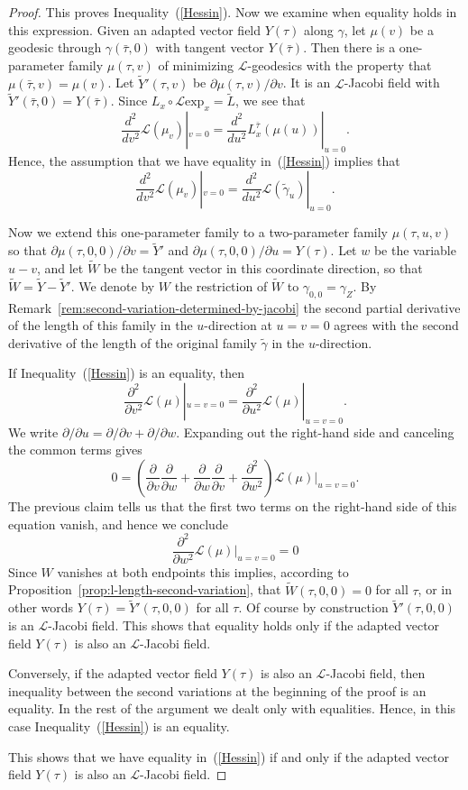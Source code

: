 \begin{proof}
This proves Inequality~(\ref{Hessin}). Now we examine when equality
holds in this expression. Given an adapted vector field $Y(\tau)$
along $\gamma$, let $\mu(v)$ be a geodesic through
$\gamma(\bar\tau,0)$ with tangent vector $Y(\bar\tau)$. Then there
is a one-parameter family $\mu(\tau,v)$ of minimizing ${\mathcal
L}$-geodesics with the property that $\mu(\bar\tau,v)=\mu(v)$. Let
$\widetilde Y'(\tau,v)$ be $\partial\mu(\tau,v)/\partial v$. It is
an ${\mathcal L}$-Jacobi field with $\widetilde
Y'(\bar\tau,0)=Y(\bar\tau)$. Since $L_x\circ {\mathcal L}\mathrm{exp}_x=\widetilde L$, we see that
$$\frac{d^2}{d v^2}{\mathcal
L}(\mu_v)|_{v=0}=\frac{d^2}{du^2}L^{\bar \tau}_x(\mu(u))|_{u=0}.$$
Hence, the assumption that we have equality in~(\ref{Hessin})
implies that
$$\frac{d^2}{d v^2}{\mathcal
L}(\mu_v)|_{v=0}=\frac{d^2}{d u^2}{\mathcal L}(\tilde\gamma_u)|_{u=0}.$$

 Now we extend this
one-parameter family to a two-parameter family $\mu(\tau,u,v)$ so
that $\partial\mu(\tau,0,0)/\partial v=\widetilde Y'$ and
$\partial\mu(\tau,0,0)/\partial u=Y(\tau)$. Let $w$ be the variable
$u-v$, and let $\widetilde W$ be the tangent vector in this
coordinate direction, so that $\widetilde W=\widetilde Y-\widetilde
Y'$. We denote by $W$ the restriction of $\widetilde W$ to
$\gamma_{0,0}=\gamma_Z$. By Remark~\ref{rem:second-variation-determined-by-jacobi} the second
partial derivative of the length of this family in the $u$-direction
at $u=v=0$ agrees with the second derivative of the length of the
original family $\widetilde \gamma$ in the $u$-direction.


If Inequality~(\ref{Hessin}) is an equality, then
$$\frac{\partial^2}{\partial v^2}{\mathcal L}(\mu)|_{u=v=0}=\frac{\partial^2}{\partial u^2}{\mathcal
L}(\mu)|_{u=v=0}.$$ We write $\partial/\partial u=\partial/\partial
v+\partial/\partial w$. Expanding out the right-hand side and
canceling the common terms gives
$$0=\left(\frac{\partial}{\partial v}\frac{\partial}{\partial w}+
\frac{\partial}{\partial w}\frac{\partial}{\partial
v}+\frac{\partial^2}{\partial w^2}\right){\mathcal
L}(\mu)|_{u=v=0}.$$ The previous claim tells us that the first two
terms on the right-hand side of this equation vanish, and hence we
conclude
$$\frac{\partial^2}{\partial w^2}{\mathcal L}(\mu)|_{u=v=0}=0$$
Since $W$ vanishes at both endpoints this implies, according to
Proposition~\ref{prop:l-length-second-variation}, that $\widetilde W(\tau,0,0)=0$ for all
$\tau$, or in other words $Y(\tau)=\widetilde Y'(\tau,0,0)$ for all
$\tau$. Of course by construction $\widetilde Y'(\tau,0,0)$ is an
${\mathcal L}$-Jacobi field. This shows that equality holds only if
the adapted vector field $Y(\tau)$ is also an ${\mathcal L}$-Jacobi
field.

Conversely, if the adapted vector field $Y(\tau)$ is also an
${\mathcal L}$-Jacobi field, then inequality between the second
variations at the beginning of the proof is an equality. In the rest
of the argument we dealt only with equalities. Hence, in this case
Inequality~(\ref{Hessin}) is an equality.

This shows that we have equality in~(\ref{Hessin}) if and only if
the adapted vector field $Y(\tau)$ is also an ${\mathcal L}$-Jacobi
field.
\end{proof}


